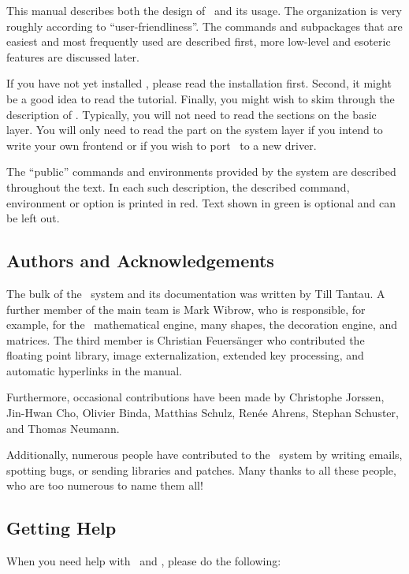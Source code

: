 \begin{paracol}{2}
This manual describes both the design of \tikzname\ and its usage. The
organization is very roughly according to ``user-friendliness''. The commands
and subpackages that are easiest and most frequently used are described first,
more low-level and esoteric features are discussed later.

If you have not yet installed \tikzname, please read the installation first.
Second, it might be a good idea to read the tutorial. Finally, you might wish
to skim through the description of \tikzname. Typically, you will not need to
read the sections on the basic layer. You will only need to read the part on
the system layer if you intend to write your own frontend or if you wish to
port \pgfname\ to a new driver.

The ``public'' commands and environments provided by the system are described
throughout the text. In each such description, the described command,
environment or option is printed in red. Text shown in green is optional and
can be left out.


\subsection{Authors and Acknowledgements}
\label{section-authors}

The bulk of the \pgfname\ system and its documentation was written by Till
Tantau. A further member of the main team is Mark Wibrow, who is responsible,
for example, for the \pgfname\ mathematical engine, many shapes, the decoration
engine, and matrices. The third member is Christian Feuers\"anger who
contributed the floating point library, image externalization, extended key
processing, and automatic hyperlinks in the manual.

Furthermore, occasional contributions have been made by Christophe Jorssen,
Jin-Hwan Cho, Olivier Binda, Matthias Schulz, Ren\'ee Ahrens, Stephan Schuster,
and Thomas Neumann.

Additionally, numerous people have contributed to the \pgfname\ system by
writing emails, spotting bugs, or sending libraries and patches. Many thanks to
all these people, who are too numerous to name them all!


\subsection{Getting Help}

When you need help with \pgfname\ and \tikzname, please do the following:


\end{paracol}
